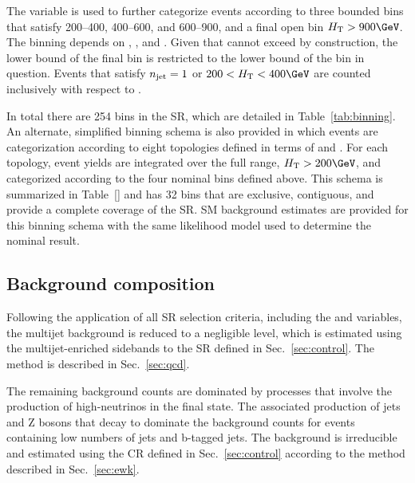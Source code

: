 The \mht variable is used to further categorize events according to
three bounded bins that satisfy 200--400, 400--600, and 600--900, and
a final open bin $\scalht > 900\GeV$. The \mht binning depends on
\njet, \nb, and \scalht. Given that \mht cannot exceed \scalht by
construction, the lower bound of the final \mht bin is restricted to
the lower bound of the \scalht bin in question. Events that satisfy
$n_{\text{jet}} = 1$ or $200 < \scalht < 400\GeV$ are counted inclusively with
respect to \mht.

In total there are 254 bins in the SR, which are detailed in
Table~\ref{tab:binning}. An alternate, simplified binning schema is
also provided in which events are categorization according to eight
topologies defined in terms of \njet and \nb. For each topology, event
yields are integrated over the full \scalht range, $\scalht >
200\GeV$, and categorized according to the four nominal \mht bins
defined above. This schema is summarized in Table~\ref{} and has 32
bins that are exclusive, contiguous, and provide a complete coverage
of the SR. SM background estimates are provided for this binning
schema with the same likelihood model used to determine the nominal
result.


\subsection{Background composition}
\label{sec:bkgd}

Following the application of all SR selection criteria, including the
\alphat and \bdphi variables, the multijet background is reduced to a
negligible level, which is estimated using the multijet-enriched
sidebands to the SR defined in Sec.~\ref{sec:control}. The method is
described in Sec.~\ref{sec:qcd}.

The remaining background counts are dominated by processes that
involve the production of high-\pt neutrinos in the final state. The
associated production of jets and Z bosons that decay to \znunu
dominate the background counts for events containing low numbers of
jets and b-tagged jets. The \znunuj background is irreducible and
estimated using the \mmj CR defined in Sec.~\ref{sec:control}
according to the method described in Sec.~\ref{sec:ewk}. 

